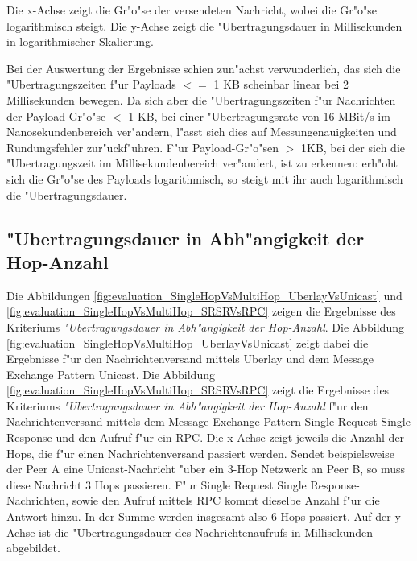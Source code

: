 Die x-Achse zeigt die Gr"o"se der versendeten Nachricht, wobei die Gr"o"se logarithmisch steigt. Die y-Achse zeigt die "Uber\-tra\-gungs\-dauer in Millisekunden in logarithmischer Skalierung.

Bei der Auswertung der Ergebnisse schien zun"achst verwunderlich, das sich die "Ubertragungszeiten f"ur Payloads $<=$ 1 KB scheinbar linear bei 2 Millisekunden bewegen. Da sich aber die "Ubertragungszeiten f"ur Nachrichten der Payload-Gr"o"se $<$ 1 KB, bei einer "Ubertragungsrate von 16 MBit/s im Nanosekundenbereich ver"andern, l"asst sich dies auf Messungenauigkeiten und Rundungsfehler zur"uckf"uhren. F"ur Payload-Gr"o"sen $>$ 1KB, bei der sich die "Ubertragungszeit  im Millisekundenbereich ver"andert, ist zu erkennen: erh"oht sich die Gr"o"se des Payloads logarithmisch, so steigt mit ihr auch logarithmisch die "Uber\-tra\-gungs\-dauer.

\subsection{"Ubertragungsdauer in Abh"angigkeit der Hop-Anzahl}



Die Abbildungen \ref{fig:evaluation_SingleHopVsMultiHop_UberlayVsUnicast} und \ref{fig:evaluation_SingleHopVsMultiHop_SRSRVsRPC} zeigen die Ergebnisse des Kriteriums \emph{"Ubertragungsdauer in Abh"angigkeit der Hop-Anzahl}. Die Abbildung \ref{fig:evaluation_SingleHopVsMultiHop_UberlayVsUnicast} zeigt dabei die Ergebnisse f"ur den Nachrichtenversand mittels Uberlay und dem Message Exchange Pattern Unicast. Die Abbildung \ref{fig:evaluation_SingleHopVsMultiHop_SRSRVsRPC} zeigt die Ergebnisse des Kriteriums \emph{"Ubertragungsdauer in Abh"angigkeit der Hop-Anzahl} f"ur den Nachrichtenversand mittels dem Message Exchange Pattern Single Request Single Response und den Aufruf f"ur ein RPC. Die  x-Achse zeigt jeweils die Anzahl der Hops, die f"ur einen Nachrichtenversand passiert werden. Sendet beispielsweise der Peer A eine Unicast-Nachricht "uber ein 3-Hop Netzwerk an Peer B, so muss diese Nachricht 3 Hops passieren. F"ur Single Request Single Response-Nachrichten, sowie den Aufruf mittels RPC kommt dieselbe Anzahl f"ur die Antwort hinzu. In der Summe werden insgesamt also 6 Hops passiert. Auf der y-Achse ist die "Uber\-tra\-gungs\-dauer des Nachrichtenaufrufs in Millisekunden abgebildet.

